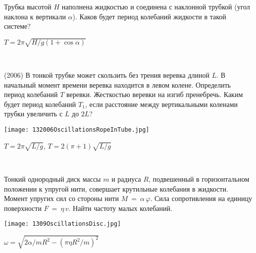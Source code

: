 \begin{ex}
Трубка высотой $H$ наполнена жидкостью и соединена с наклонной трубкой (угол наклона к вертикали $\alpha$). Каков будет период колебаний жидкости в такой системе?
\begin{ans}
$T=2\pi \sqrt{H/g(1+\cos \alpha)}$
\end{ans}
\end{ex}

\begin{ex}
\hspace{0pt} \\
\begin{minipage}{.65\textwidth} 
(2006) В тонкой трубке может скользить без трения веревка длиной $L$. В начальный момент времени веревка находится в левом колене. 
Определить период колебаний $T$ веревки. Жесткостью веревки на изгиб пренебречь. 
Каким будет период колебаний $T_1$, если расстояние между вертикальными коленами трубки увеличить с $L$ до $2L$?
\end{minipage}
\begin{minipage}{.35\textwidth}
\centering
\texttt{[image: 132006OscillationsRopeInTube.jpg]}
\end{minipage}
\begin{ans}
$T=2\pi\sqrt{L/g}$, $T=2(\pi+1)\sqrt{L/g}$
\end{ans}
\end{ex}


\begin{ex}
\hspace{0pt} \\
\begin{minipage}{.65\textwidth} 
Тонкий однородный диск массы $m$ и радиуса $R$, подвешенный в горизонтальном положении к упругой нити, совершает крутильные колебания в жидкости. 
Момент упругих сил со стороны нити $M~=~\alpha\,\varphi$.  Сила сопротивления на единицу поверхности $F~=~\eta\,v$. Найти частоту малых колебаний.
\end{minipage}
\begin{minipage}{.35\textwidth}
\centering
\texttt{[image: 1309OscillationsDisc.jpg]}
\end{minipage}
\begin{ans}
$\omega = \sqrt{2\alpha/mR^2-(\pi \eta R^2/m)^2}$
\end{ans}
\end{ex}

